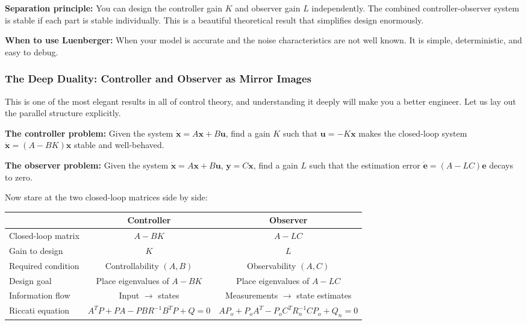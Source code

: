 \textbf{Separation principle:} You can design the controller gain $K$ and observer gain $L$ independently. The combined controller-observer system is stable if each part is stable individually. This is a beautiful theoretical result that simplifies design enormously.

\textbf{When to use Luenberger:} When your model is accurate and the noise characteristics are not well known. It is simple, deterministic, and easy to debug.

\subsubsection{The Deep Duality: Controller and Observer as Mirror Images}

This is one of the most elegant results in all of control theory, and understanding it deeply will make you a better engineer. Let us lay out the parallel structure explicitly.

\textbf{The controller problem:} Given the system $\dot{\mathbf{x}} = A\mathbf{x} + B\mathbf{u}$, find a gain $K$ such that $\mathbf{u} = -K\mathbf{x}$ makes the closed-loop system $\dot{\mathbf{x}} = (A - BK)\mathbf{x}$ stable and well-behaved.

\textbf{The observer problem:} Given the system $\dot{\mathbf{x}} = A\mathbf{x} + B\mathbf{u}$, $\mathbf{y} = C\mathbf{x}$, find a gain $L$ such that the estimation error $\dot{\mathbf{e}} = (A - LC)\mathbf{e}$ decays to zero.

Now stare at the two closed-loop matrices side by side:

\begin{center}
\begin{tabular}{lcc}
\toprule
 & \textbf{Controller} & \textbf{Observer} \\
\midrule
Closed-loop matrix & $A - BK$ & $A - LC$ \\
Gain to design & $K$ & $L$ \\
Required condition & Controllability $(A, B)$ & Observability $(A, C)$ \\
Design goal & Place eigenvalues of $A - BK$ & Place eigenvalues of $A - LC$ \\
Information flow & Input $\to$ states & Measurements $\to$ state estimates \\
Riccati equation & $A^TP + PA - PBR^{-1}B^TP + Q = 0$ & $AP_o + P_oA^T - P_oC^TR_n^{-1}CP_o + Q_n = 0$ \\
\bottomrule
\end{tabular}
\end{center}

